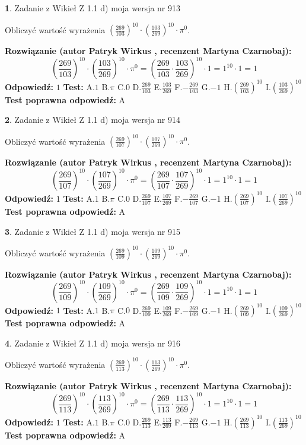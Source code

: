 \documentclass[12pt, a4paper]{article}
\theoremstyle{definition} %
\newtheorem{zad}{}
\newcommand{\zadStart}[1]{\begin{zad}#1\newline}
\newcommand{\zadStop}{\end{zad}}
\newcommand{\rozwStart}[2]{\noindent \textbf{Rozwiązanie (autor #1 , recenzent #2): }\newline}
\newcommand{\rozwStop}{\newline}
\newcommand{\odpStart}{\noindent \textbf{Odpowiedź:}\newline}
\newcommand{\odpStop}{\newline}
\newcommand{\testStart}{\noindent \textbf{Test:}\newline}
\newcommand{\testStop}{\newline}
\newcommand{\kluczStart}{\noindent \textbf{Test poprawna odpowiedź:}\newline}
\newcommand{\kluczStop}{\newline}
\begin{document}
\zadStart{Zadanie z Wikieł Z 1.1 d) moja wersja nr 913}

Obliczyć wartość wyrażenia $(\frac{269}{103})^{10} \cdot (\frac{103}{269})^{10} \cdot \pi^{0}$.
\zadStop
\rozwStart{Patryk Wirkus}{Martyna Czarnobaj}
$$(\frac{269}{103})^{10} \cdot (\frac{103}{269})^{10} \cdot \pi^{0} = (\frac{269}{103} \cdot \frac{103}{269})^{10} \cdot 1 = 1^{10} \cdot 1 = 1$$
\rozwStop
\odpStart
$1$
\odpStop
\testStart
A.$1$ B.$\pi$ C.$0$ D.$\frac{269}{103}$ E.$\frac{103}{269}$
F.$-\frac{269}{103}$ G.$-1$
H.$(\frac{269}{103})^{10}$
I.$(\frac{103}{269})^{10}$
\testStop
\kluczStart
A
\kluczStop



\zadStart{Zadanie z Wikieł Z 1.1 d) moja wersja nr 914}

Obliczyć wartość wyrażenia $(\frac{269}{107})^{10} \cdot (\frac{107}{269})^{10} \cdot \pi^{0}$.
\zadStop
\rozwStart{Patryk Wirkus}{Martyna Czarnobaj}
$$(\frac{269}{107})^{10} \cdot (\frac{107}{269})^{10} \cdot \pi^{0} = (\frac{269}{107} \cdot \frac{107}{269})^{10} \cdot 1 = 1^{10} \cdot 1 = 1$$
\rozwStop
\odpStart
$1$
\odpStop
\testStart
A.$1$ B.$\pi$ C.$0$ D.$\frac{269}{107}$ E.$\frac{107}{269}$
F.$-\frac{269}{107}$ G.$-1$
H.$(\frac{269}{107})^{10}$
I.$(\frac{107}{269})^{10}$
\testStop
\kluczStart
A
\kluczStop



\zadStart{Zadanie z Wikieł Z 1.1 d) moja wersja nr 915}

Obliczyć wartość wyrażenia $(\frac{269}{109})^{10} \cdot (\frac{109}{269})^{10} \cdot \pi^{0}$.
\zadStop
\rozwStart{Patryk Wirkus}{Martyna Czarnobaj}
$$(\frac{269}{109})^{10} \cdot (\frac{109}{269})^{10} \cdot \pi^{0} = (\frac{269}{109} \cdot \frac{109}{269})^{10} \cdot 1 = 1^{10} \cdot 1 = 1$$
\rozwStop
\odpStart
$1$
\odpStop
\testStart
A.$1$ B.$\pi$ C.$0$ D.$\frac{269}{109}$ E.$\frac{109}{269}$
F.$-\frac{269}{109}$ G.$-1$
H.$(\frac{269}{109})^{10}$
I.$(\frac{109}{269})^{10}$
\testStop
\kluczStart
A
\kluczStop



\zadStart{Zadanie z Wikieł Z 1.1 d) moja wersja nr 916}

Obliczyć wartość wyrażenia $(\frac{269}{113})^{10} \cdot (\frac{113}{269})^{10} \cdot \pi^{0}$.
\zadStop
\rozwStart{Patryk Wirkus}{Martyna Czarnobaj}
$$(\frac{269}{113})^{10} \cdot (\frac{113}{269})^{10} \cdot \pi^{0} = (\frac{269}{113} \cdot \frac{113}{269})^{10} \cdot 1 = 1^{10} \cdot 1 = 1$$
\rozwStop
\odpStart
$1$
\odpStop
\testStart
A.$1$ B.$\pi$ C.$0$ D.$\frac{269}{113}$ E.$\frac{113}{269}$
F.$-\frac{269}{113}$ G.$-1$
H.$(\frac{269}{113})^{10}$
I.$(\frac{113}{269})^{10}$
\testStop
\kluczStart
A
\kluczStop
\end{document}
